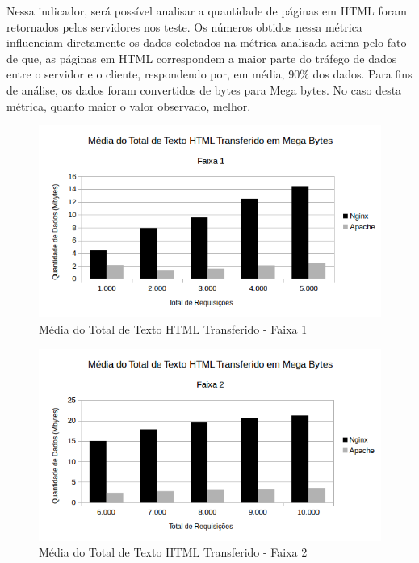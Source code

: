 Nessa indicador, será possível analisar a quantidade de páginas em HTML foram 
retornados pelos servidores nos teste. Os números obtidos nessa métrica 
influenciam diretamente os dados coletados na métrica analisada acima pelo fato 
de que, as páginas em HTML correspondem a maior parte do tráfego de dados entre 
o servidor e o cliente, respondendo por, em média, 90\% dos dados. Para fins de 
análise, os dados foram convertidos de bytes para Mega bytes. No caso desta 
métrica, quanto maior o valor observado, melhor.

\begin{figure}[H]
	\centering
	\includegraphics[width=1\linewidth]{graficos/grafico3-f1} 
	\caption{Média do Total de Texto HTML Transferido - Faixa 1}
	\label{fig:grafico3-f1}
\end{figure}

\begin{figure}[H]
	\centering
	\includegraphics[width=1\linewidth]{graficos/grafico3-f2} 
	\caption{Média do Total de Texto HTML Transferido - Faixa 2}
	\label{fig:grafico3-f2}
\end{figure}

